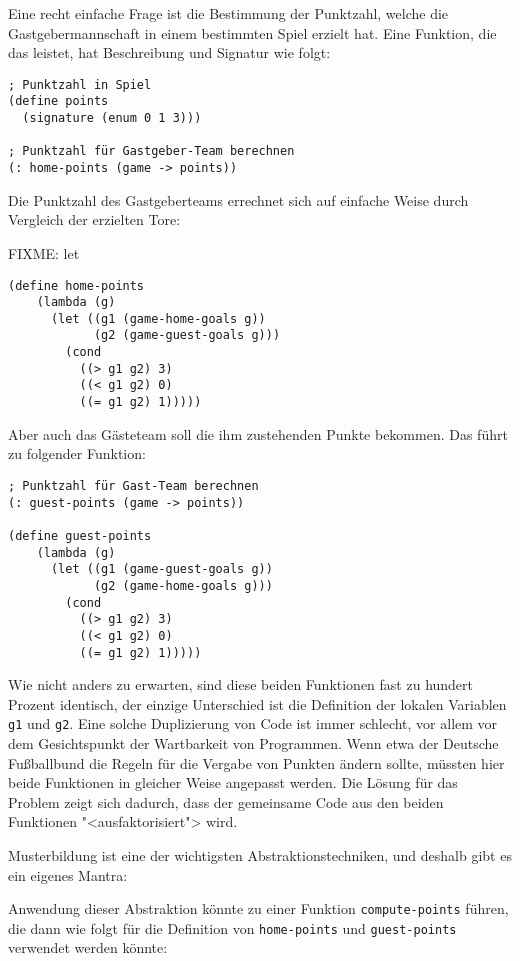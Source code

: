 Eine recht einfache Frage ist die Bestimmung der Punktzahl, welche die
Gastgebermannschaft in einem bestimmten Spiel erzielt hat. Eine Funktion, die
das leistet, hat Beschreibung und Signatur wie
folgt:

\begin{verbatim}
; Punktzahl in Spiel
(define points
  (signature (enum 0 1 3)))

; Punktzahl für Gastgeber-Team berechnen
(: home-points (game -> points))
\end{verbatim}
Die Punktzahl des Gastgeberteams errechnet sich auf einfache Weise durch
Vergleich der erzielten Tore:

FIXME: let

\begin{verbatim}
(define home-points
    (lambda (g)
      (let ((g1 (game-home-goals g))
            (g2 (game-guest-goals g)))
        (cond
          ((> g1 g2) 3)
          ((< g1 g2) 0)
          ((= g1 g2) 1)))))
\end{verbatim}
Aber auch das Gästeteam soll die ihm zustehenden Punkte bekommen. Das führt zu
folgender Funktion:
\begin{verbatim}
; Punktzahl für Gast-Team berechnen
(: guest-points (game -> points))

(define guest-points
    (lambda (g)
      (let ((g1 (game-guest-goals g))
            (g2 (game-home-goals g)))
        (cond
          ((> g1 g2) 3)
          ((< g1 g2) 0)
          ((= g1 g2) 1)))))
\end{verbatim}
Wie nicht anders zu erwarten, sind diese beiden Funktionen fast zu hundert
Prozent identisch, der einzige Unterschied ist die Definition der lokalen
Variablen \texttt{g1} und \texttt{g2}. Eine solche Duplizierung von Code ist
immer schlecht, vor allem vor dem Gesichtspunkt der Wartbarkeit von
Programmen. Wenn etwa der Deutsche Fußballbund die Regeln für die Vergabe von
Punkten ändern sollte, müssten hier beide Funktionen in gleicher Weise
angepasst werden.  Die Lösung für das Problem zeigt sich dadurch, dass der
gemeinsame Code aus den beiden Funktionen "<ausfaktorisiert"> wird. 

Musterbildung ist eine der wichtigsten Abstraktionstechniken, und deshalb gibt
es ein eigenes Mantra:

\mantraabstraktion*

Anwendung dieser Abstraktion könnte zu einer Funktion \texttt{compute-points}
führen, die dann wie folgt für die Definition von \texttt{home-points} und
\texttt{guest-points} verwendet werden könnte:

